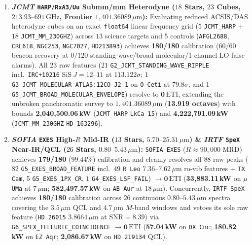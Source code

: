 \documentclass[twocolumn,10pt]{article}
\begin{document}
\begin{enumerate}
  \item \textbf{\textit{JCMT} \texttt{HARP/RxA3/Uu} Submm/mm Heterodyne ($18$ Stars, $23$ Cubes, $213.93\text{--}691\,\text{GHz}$, Frontier $1{,}401.36089\,\mu\text{m}$):} Evaluating reduced ACSIS/DAS heterodyne cubes on an exact \texttt{float64} linear frequency grid ($5$ \texttt{JCMT\_HARP} + $18$ \texttt{JCMT\_MM\_230GHZ}) across $13$ science targets and $5$ controls (\texttt{AFGL2688}, \texttt{CRL618}, \texttt{NGC253}, \texttt{NGC7027}, \texttt{HD213893}) achieves \textbf{180/180} calibration ($60/60$ beacon recovery at $0/120$ standing-wave/broad-molecular/1-channel LO false alarms). All $23$ raw features ($21$ \texttt{G2\_JCMT\_STANDING\_WAVE\_RIPPLE} incl.\ \texttt{IRC+10216} $\mathrm{SiS}\ J=12\text{--}11$ at $113.122\sigma$; $1$ \texttt{G3\_JCMT\_MOLECULAR\_ATLAS:12CO\_J2-1} on \texttt{O\,Ceti} at $79.8\sigma$; and $1$ \texttt{G5\_JCMT\_BROAD\_MOLECULAR\_ENVELOPE}) resolve to $\mathbf{0\,\mathrm{ETI}}$, extending the unbroken panchromatic survey to $1{,}401.36089\,\mu\text{m}$ (\textbf{13.919 octaves}) with bounds \textbf{2,040,500.06\,kW} (\texttt{JCMT\_HARP} \texttt{LkCa\,15}) and \textbf{4,222,791.09\,kW} (\texttt{JCMT\_MM\_230GHZ} \texttt{HD\,163296}).
  \item \textbf{\textit{SOFIA} \texttt{EXES} High-$R$ Mid-IR ($13$ Stars, $5.70\text{--}25.31\,\mu\text{m}$) \& \textit{IRTF} \texttt{SpeX} Near-IR/QCL ($26$ Stars, $0.80\text{--}5.43\,\mu\text{m}$):} \texttt{SOFIA\_EXES} ($R\approx 90{,}000$ MRD) achieves \textbf{179/180} ($99.44\%$) calibration and cleanly resolves all $88$ raw peaks ($82$ \texttt{G5\_EXES\_BROAD\_FEATURE} incl.\ $49$ \texttt{R\,Leo} $7.36\text{--}7.62\,\mu\text{m}$ ro-vib features + \texttt{TX\,Cam}, $5$ \texttt{G5\_EXES\_1PX\_CR}, $1$ \texttt{G4\_EXES\_LSF\_FAIL}) $\rightarrow \mathbf{0\,\mathrm{ETI}}$ (\textbf{33,883.11\,kW} on $\mu$\,\texttt{UMa} at $7\,\mu\text{m}$; \textbf{582,497.57\,kW} on \texttt{AB\,Aur} at $18\,\mu\text{m}$). Concurrently, \texttt{IRTF\_SpeX} achieves \textbf{180/180} calibration across $26$ continuous $0.80\text{--}5.43\,\mu\text{m}$ spectra covering the $3.5\,\mu\text{m}$ QCL and $4.7\,\mu\text{m}$ $M$-band windows and vetoes its sole raw feature (\texttt{HD\,26015} $3.8664\,\mu\text{m}$ at $\mathrm{SNR}=8.39$) via \texttt{G6\_SPEX\_TELLURIC\_COINCIDENCE} $\rightarrow \mathbf{0\,\mathrm{ETI}}$ (\textbf{57.04\,kW} on \texttt{DX\,Cnc}; \textbf{180.82\,kW} on \texttt{EZ\,Aqr}; \textbf{2,086.67\,kW} on \texttt{HD\,219134} QCL).

\end{enumerate}
\end{document}
